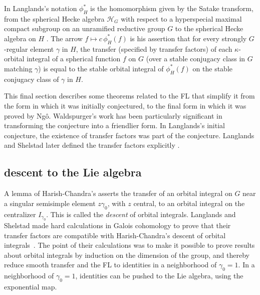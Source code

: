 \documentclass[brochure,english,12pt]{bourbaki}
\begin{document}
 In Langlands's notation $\phi_H^*$ is the homomorphism given by the
 Satake transform, from the spherical Hecke algebra ${\mathcal H}_G$
  with respect to a hyperspecial maximal compact subgroup
on an unramified reductive group $G$ to the spherical Hecke algebra
 on $H$ .  The
 arrow $f\mapsto c\,\phi_H^*(f)$ is his assertion that for every
 strongly $G$-regular element $\gamma$ in $H$, the transfer (specified by
 transfer factors) of each $\kappa$-orbital integral of a spherical
 function $f$ on $G$ (over a stable conjugacy class in $G$ matching
 $\gamma$) is equal to the stable orbital integral of $\phi_H^*(f)$ on
 the stable conjugacy class of $\gamma$ in $H$.

 This final section describes some theorems related to the FL that
 simplify it from the form in which it was initially conjectured, to
 the final form in which it was proved by Ng\^o.  Waldspurger's work has
 been particularly significant in transforming the conjecture into a
 friendlier form.  In Langlands's initial conjecture, the existence of
 transfer factors was part of the conjecture.  Langlands and Shelstad
 later defined the transfer factors explicitly \cite{LS:1987}.

\subsection{descent to the Lie algebra}\label{sec:descent}

A lemma of Harish-Chandra's asserts the transfer of an orbital
integral on $G$ near a singular semisimple element $z\gamma_0$, with
$z$ central, to an orbital integral on the centralizer $I_{\gamma_0}$.
This is called the {\it descent} of orbital integrals.  Langlands and
Shelstad made hard calculations in Galois cohomology to prove that their
transfer factors are compatible with Harish-Chandra's descent of
orbital integrals~\cite{LS:1990}.  The point of their calculations was
to make it possible to prove results about orbital integrals by
induction on the dimension of the group, and thereby reduce smooth
transfer and the FL to identities in a neighborhood of $\gamma_0=1$.
In a neighborhood of $\gamma_0=1$, identities can be pushed to the Lie
algebra, using the exponential map.
\end{document}
